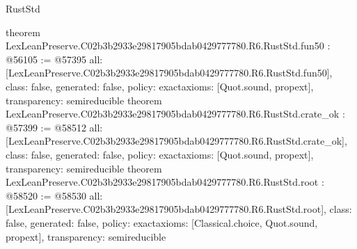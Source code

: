 \begin{lexlean}{RustStd}
\begin{coremodule}
{}
theorem LexLeanPreserve.C02b3b2933e29817905bdab0429777780.R6.RustStd.fun50 : @56105 := @57395 {
  all: [LexLeanPreserve.C02b3b2933e29817905bdab0429777780.R6.RustStd.fun50],
  class: false,
  generated: false,
  policy: exact{axioms: [Quot.sound, propext]},
  transparency: semireducible
}
theorem LexLeanPreserve.C02b3b2933e29817905bdab0429777780.R6.RustStd.crate_ok : @57399 := @58512 {
  all: [LexLeanPreserve.C02b3b2933e29817905bdab0429777780.R6.RustStd.crate_ok],
  class: false,
  generated: false,
  policy: exact{axioms: [Quot.sound, propext]},
  transparency: semireducible
}
theorem LexLeanPreserve.C02b3b2933e29817905bdab0429777780.R6.RustStd.root : @58520 := @58530 {
  all: [LexLeanPreserve.C02b3b2933e29817905bdab0429777780.R6.RustStd.root],
  class: false,
  generated: false,
  policy: exact{axioms: [Classical.choice, Quot.sound, propext]},
  transparency: semireducible
}


\end{coremodule}
\end{lexlean}
